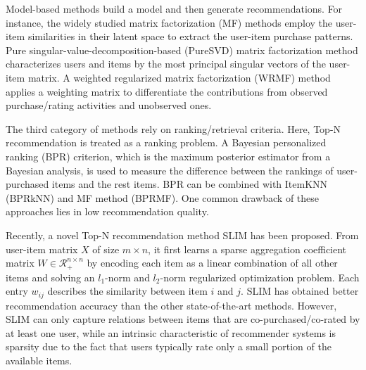 \documentclass[letterpaper]{article}
\begin{document}
Model-based methods build a model and then generate recommendations. For instance, the widely studied matrix factorization (MF) methods employ the user-item similarities in their latent space to extract the user-item purchase patterns. Pure singular-value-decomposition-based (PureSVD) matrix factorization method \cite{cremonesi2010performance} characterizes users and items by the most principal singular vectors of the user-item matrix. A weighted regularized matrix factorization (WRMF) \cite{pan2008one,hu2008collaborative} method applies a weighting matrix to differentiate the contributions from observed purchase/rating activities and unobserved ones.%

The third category of methods rely on ranking/retrieval criteria. Here, Top-N recommendation is treated as a ranking problem. A Bayesian personalized ranking (BPR) \cite{rendle2009bpr} criterion, which is the maximum posterior estimator from a Bayesian analysis, is used to measure the difference between the rankings of user-purchased items and the rest items. BPR can be combined with ItemKNN (BPRkNN) and MF method (BPRMF). One common drawback of these approaches lies in low recommendation quality.

Recently, a novel Top-N recommendation method SLIM \cite{ning2011slim} has been proposed. From user-item matrix $X$ of size $m\times n$, it first learns a sparse aggregation coefficient matrix $W\in\mathcal{R}_{+}^{n\times n}$ by encoding each item as a linear combination of all other items and solving an $l_1$-norm and $l_2$-norm regularized optimization problem. Each entry $w_{ij}$ describes the similarity between item $i$ and $j$. SLIM has obtained better recommendation accuracy than the other state-of-the-art methods. However, SLIM can only capture relations between items that are co-purchased/co-rated by at least one user, while an intrinsic characteristic of recommender systems is sparsity due to the fact that users typically rate only a small portion of the available items.
\end{document}
